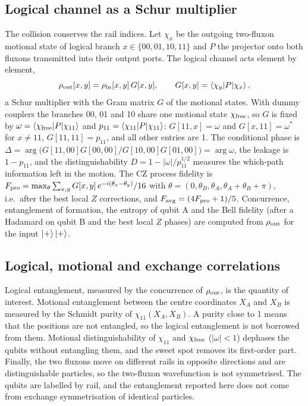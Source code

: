 \documentclass[10pt,twocolumn,letterpaper]{article}
\begin{document}
\subsection{Logical channel as a Schur multiplier}
The collision conserves the rail indices. Let $\chi_x$ be the outgoing two-fluxon motional state of logical branch
$x\in\{00,01,10,11\}$ and $P$ the projector onto both fluxons transmitted into their output ports. The logical channel
acts element by element,
\begin{equation}
\rho_{\rm out}[x,y]=\rho_{\rm in}[x,y]\,G[x,y],\qquad G[x,y]=\braket{\chi_y|P|\chi_x},
\label{eq:schur}
\end{equation}
a Schur multiplier with the Gram matrix $G$ of the motional states. With dummy couplers the branches 00, 01 and 10
share one motional state $\chi_{\rm free}$, so $G$ is fixed by $\omega=\braket{\chi_{\rm free}|P|\chi_{11}}$ and
$p_{11}=\braket{\chi_{11}|P|\chi_{11}}$: $G[11,x]=\omega$ and $G[x,11]=\omega^*$ for $x\neq11$, $G[11,11]=p_{11}$, and
all other entries are 1. The conditional phase is $\Delta=\arg\big(G[11,00]G[00,00]/G[10,00]G[01,00]\big)=\arg\omega$,
the leakage is $1-p_{11}$, and the distinguishability $D=1-|\omega|/p_{11}^{1/2}$ measures the which-path information
left in the motion. The CZ process fidelity is $F_{\rm pro}=\max_\theta\sum_{x,y}G[x,y]\,e^{-i(\theta_x-\theta_y)}/16$
with $\theta=(0,\theta_B,\theta_A,\theta_A+\theta_B+\pi)$, i.e.\ after the best local $Z$ corrections, and
$F_{\rm avg}=(4F_{\rm pro}+1)/5$. Concurrence, entanglement of formation, the entropy of qubit A and the Bell fidelity
(after a Hadamard on qubit B and the best local $Z$ phases) are computed from $\rho_{\rm out}$ for the input
$\ket{+}\ket{+}$.

\subsection{Logical, motional and exchange correlations}
Logical entanglement, measured by the concurrence of $\rho_{\rm out}$, is the quantity of interest. Motional
entanglement between the centre coordinates $X_A$ and $X_B$ is measured by the Schmidt purity of
$\chi_{11}(X_A,X_B)$. A purity close to 1 means that the positions are not entangled, so the logical entanglement is
not borrowed from them. Motional distinguishability of $\chi_{11}$ and $\chi_{\rm free}$ ($|\omega|<1$) dephases the
qubits without entangling them, and the sweet spot removes its first-order part. Finally, the two fluxons move on
different rails in opposite directions and are distinguishable particles, so the two-fluxon wavefunction is not
symmetrised. The qubits are labelled by rail, and the entanglement reported here does not come from exchange
symmetrisation of identical particles.
\end{document}
